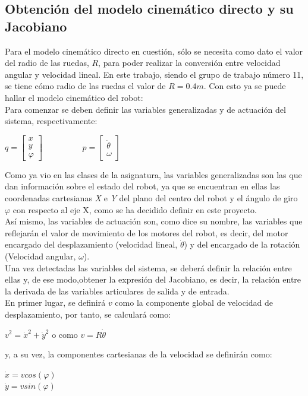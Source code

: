 \documentclass[a4paper,twoside]{article}
\begin{document}
\subsection{Obtención del modelo cinemático directo y su Jacobiano}
Para el modelo cinemático directo en cuestión, sólo se necesita como dato el valor del radio de las ruedas, $R$, para poder realizar la conversión entre velocidad angular y velocidad lineal. En este trabajo, siendo el grupo de trabajo número 11, se tiene cómo radio de las ruedas el valor de $R = 0.4 m$. Con esto ya se puede hallar el modelo cinemático del robot:\\

	Para comenzar se deben definir las variables generalizadas y de actuación del sistema, respectivamente:
	\begin{center}
		$
		q=
		\begin{bmatrix}
		x\\
		y\\
		\varphi
		\end{bmatrix}
		$$
		\hspace{2cm}
		$$
		p=
		\begin{bmatrix}
		\dot{\theta} \\
		\omega
		\end{bmatrix}
		$
\end{center}

Como ya vio en las clases de la asignatura, las variables generalizadas son las que dan información sobre el estado del robot, ya que se encuentran en ellas las coordenadas cartesianas \textit{X} e \textit{Y} del plano del centro del robot y el ángulo de giro $\varphi$ con respecto al eje X, como se ha decidido definir en este proyecto.\\
Así mismo, las variables de actuación son, como dice su nombre, las variables que reflejarán el valor de movimiento de los motores del robot, es decir, del motor encargado del desplazamiento (velocidad lineal, $\dot{\theta}$) y del encargado de la rotación (Velocidad angular, $\omega$).\\

Una vez detectadas las variables del sistema, se deberá definir la relación entre ellas y, de ese modo,obtener la expresión del Jacobiano, es decir, la relación entre la derivada de las variables articulares de salida y de entrada.\\
En primer lugar, se definirá $v$ como la componente global de velocidad de desplazamiento, por tanto, se calculará como:
\begin{center}
	$v^2=\dot{x}^2+\dot{y}^2$ o como $v=R \dot{\theta}$
	\end{center}
	y, a su vez, la componentes cartesianas de la velocidad se definirán como:
	\begin{center}
	$\dot{x}=v cos(\varphi)$\\
	$\dot{y}=v sin(\varphi)$
	\end{center}
\end{document}
